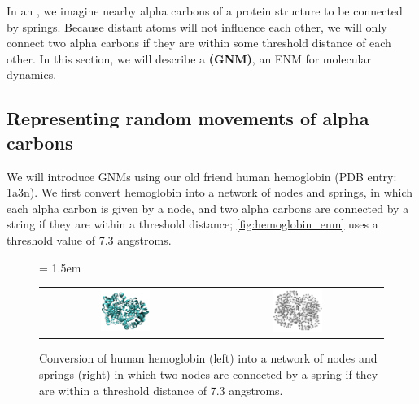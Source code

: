 In an , we imagine nearby alpha carbons of a protein structure to be connected by springs. Because distant atoms will not influence each other, we will only connect two alpha carbons if they are within some threshold distance of each other. In this section, we will describe a  \textbf{(GNM)}, an ENM for molecular dynamics.


\FloatBarrier
{}
\subsection{Representing random movements of alpha carbons}

We will introduce GNMs using our old friend human hemoglobin (PDB entry: \href{https://www.rcsb.org/structure/1a3n}{1a3n}). We first convert hemoglobin into a network of nodes and springs, in which each alpha carbon is given by a node, and two alpha carbons are connected by a string if they are within a threshold distance; \autoref{fig:hemoglobin_enm} uses a threshold value of 7.3 angstroms.\\

\begin{figure}[h]
	\centering
	\tabcolsep = 1.5em
	\mySfFamily
	\begin{tabular}{c c}
		\includegraphics[width = 0.3\textwidth]{../images/hemoglobin.png} & \includegraphics[width = 0.3\textwidth]{../images/hemoglobin_network.png}
	\end{tabular}
	\caption{Conversion of human hemoglobin (left) into a network of nodes and springs (right) in which two nodes are connected by a spring if they are within a threshold distance of 7.3 angstroms.}
	\label{fig:hemoglobin_enm}
\end{figure}

